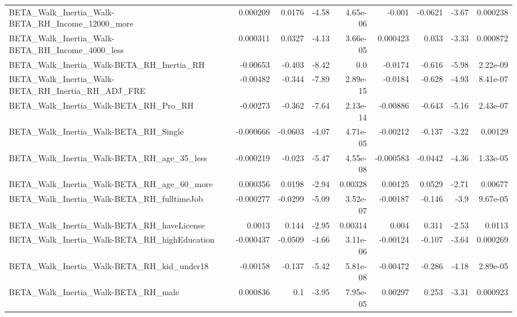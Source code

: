 \begin{tabular}{lrrrrrrrr}
BETA\_Walk\_Inertia\_Walk-BETA\_RH\_Income\_12000\_more   &    0.000209 &       0.0176 &    -4.58 & 4.65e-06 &     -0.001 &     -0.0621 &        -3.67 &      0.000238 \\
BETA\_Walk\_Inertia\_Walk-BETA\_RH\_Income\_4000\_less    &    0.000311 &       0.0327 &    -4.13 & 3.66e-05 &   0.000423 &       0.033 &        -3.33 &      0.000872 \\
BETA\_Walk\_Inertia\_Walk-BETA\_RH\_Inertia\_RH          &    -0.00653 &       -0.403 &    -8.42 &      0.0 &    -0.0174 &      -0.616 &        -5.98 &      2.22e-09 \\
BETA\_Walk\_Inertia\_Walk-BETA\_RH\_Inertia\_RH\_ADJ\_FRE  &    -0.00482 &       -0.344 &    -7.89 & 2.89e-15 &    -0.0184 &      -0.628 &        -4.93 &      8.41e-07 \\
BETA\_Walk\_Inertia\_Walk-BETA\_RH\_Pro\_RH              &    -0.00273 &       -0.362 &    -7.64 & 2.13e-14 &   -0.00886 &      -0.643 &        -5.16 &      2.43e-07 \\
BETA\_Walk\_Inertia\_Walk-BETA\_RH\_Single              &   -0.000666 &      -0.0603 &    -4.07 & 4.71e-05 &   -0.00212 &      -0.137 &        -3.22 &       0.00129 \\
BETA\_Walk\_Inertia\_Walk-BETA\_RH\_age\_35\_less         &   -0.000219 &       -0.023 &    -5.47 & 4.55e-08 &  -0.000583 &     -0.0442 &        -4.36 &      1.33e-05 \\
BETA\_Walk\_Inertia\_Walk-BETA\_RH\_age\_60\_more         &    0.000356 &       0.0198 &    -2.94 &  0.00328 &    0.00125 &      0.0529 &        -2.71 &       0.00677 \\
BETA\_Walk\_Inertia\_Walk-BETA\_RH\_fulltimeJob         &   -0.000277 &      -0.0299 &    -5.09 & 3.52e-07 &   -0.00187 &      -0.146 &         -3.9 &      9.67e-05 \\
BETA\_Walk\_Inertia\_Walk-BETA\_RH\_haveLicense         &      0.0013 &        0.144 &    -2.95 &  0.00314 &      0.004 &       0.311 &        -2.53 &        0.0113 \\
BETA\_Walk\_Inertia\_Walk-BETA\_RH\_highEducation       &   -0.000437 &      -0.0509 &    -4.66 & 3.11e-06 &   -0.00124 &      -0.107 &        -3.64 &      0.000269 \\
BETA\_Walk\_Inertia\_Walk-BETA\_RH\_kid\_under18         &    -0.00158 &       -0.137 &    -5.42 & 5.81e-08 &   -0.00472 &      -0.286 &        -4.18 &      2.89e-05 \\
BETA\_Walk\_Inertia\_Walk-BETA\_RH\_male                &    0.000836 &          0.1 &    -3.95 & 7.95e-05 &    0.00297 &       0.253 &        -3.31 &      0.000923 \\

\end{tabular}
